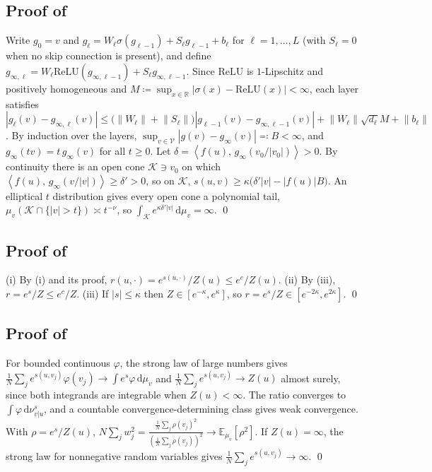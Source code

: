 \documentclass[11pt]{article}
\theoremstyle{plain}
\theoremstyle{definition}
\theoremstyle{remark}
\newcommand{\RR}{\mathbb{R}}
\newcommand{\E}{\mathbb{E}}
\newcommand{\VV}{\mathcal{V}}
\newcommand{\KK}{\mathcal{K}}
\newcommand{\Dd}{\mathrm{d}}
\newcommand{\define}{\coloneqq}
\newcommand{\IP}[2]{\left\langle #1,\, #2 \right\rangle}
\newcommand{\abs}[1]{\left\lvert #1 \right\rvert}
\newcommand{\norm}[1]{\left\lVert #1 \right\rVert}
\begin{document}
\subsection{Proof of \texorpdfstring{}{Proposition 4.3}}
\label{app:relu}
Write $g_0=v$ and $g_\ell=W_\ell\sigma(g_{\ell-1})+S_\ell g_{\ell-1}+b_\ell$ for
$\ell=1,\ldots,L$ (with $S_\ell=0$ when no skip connection is present), and define
$g_{\infty,\ell}=W_\ell\mathrm{ReLU}(g_{\infty,\ell-1})+S_\ell g_{\infty,\ell-1}$.
Since $\mathrm{ReLU}$ is $1$-Lipschitz and positively homogeneous and
$M\define\sup_{x\in\RR}\abs{\sigma(x)-\mathrm{ReLU}(x)}<\infty$, each layer
satisfies
$\abs{g_\ell(v)-g_{\infty,\ell}(v)}\le\bigl(\norm{W_\ell}+\norm{S_\ell}\bigr)\abs{g_{\ell-1}(v)-g_{\infty,\ell-1}(v)}+\norm{W_\ell}\sqrt{d_\ell}M+\norm{b_\ell}$.
By induction over the layers,
$\sup_{v\in\VV}\abs{g(v)-g_\infty(v)}\eqqcolon B<\infty$, and
$g_\infty(tv)=t\,g_\infty(v)$ for all $t\ge0$. Let
$\delta=\IP{f(u)}{g_\infty(v_0/\abs{v_0})}>0$. By continuity there is an open
cone $\KK\ni v_0$ on which $\IP{f(u)}{g_\infty(v/\abs{v})}\ge\delta'>0$, so
on $\KK$, $s(u,v)\ge\kappa\bigl(\delta'\abs{v}-\abs{f(u)}B\bigr)$. An
elliptical $t$ distribution gives every open cone a polynomial tail,
$\mu_v(\KK\cap\{\abs{v}>t\})\asymp t^{-\nu}$, so
$\int_{\KK}e^{\kappa\delta'\abs{v}}\,\Dd\mu_v=\infty$.
\qed

\subsection{Proof of \texorpdfstring{}{Proposition 4.4}}
\label{app:price}
(i) By (i) and its proof, $r(u,\cdot)=e^{s(u,\cdot)}/Z(u)\le e^{c}/Z(u)$.
(ii) By (iii), $r=e^{s}/Z\le e^{c}/Z$. (iii) If
$\abs{s}\le\kappa$ then $Z\in[e^{-\kappa},e^{\kappa}]$, so
$r=e^{s}/Z\in[e^{-2\kappa},e^{2\kappa}]$.
\qed

\subsection{Proof of \texorpdfstring{}{Theorem 4.5}}
\label{app:bank}
For bounded continuous $\varphi$, the strong law of large numbers gives
$\frac1N\sum_{j}e^{s(u,v_j)}\varphi(v_j)\to\int e^{s}\varphi\,\Dd\mu_v$ and
$\frac1N\sum_{j}e^{s(u,v_j)}\to Z(u)$ almost surely, since both integrands
are integrable when $Z(u)<\infty$. The ratio converges to
$\int\varphi\,\Dd\nu^{s}_{v\vert u}$, and a countable convergence-determining
class gives weak convergence. With $\rho=e^{s}/Z(u)$,
$N\sum_{j}w_j^{2}=\frac{\frac1N\sum_j\rho(v_j)^{2}}{(\frac1N\sum_j\rho(v_j))^{2}}\to\E_{\mu_v}[\rho^{2}]$.
If $Z(u)=\infty$, the strong law for nonnegative random variables gives
$\frac1N\sum_{j}e^{s(u,v_j)}\to\infty$.
\qed
\end{document}
